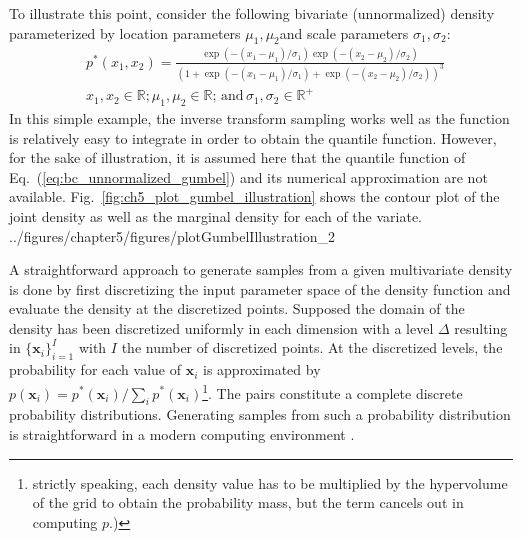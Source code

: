 To illustrate this point,
consider the following bivariate (unnormalized) density parameterized by location parameters $\mu_1, \mu_2$and scale parameters $\sigma_1, \sigma_2$:
\begin{equation}
	\begin{split}
	& p^*(x_1, x_2) = \frac{\exp{(-(x_1 - \mu_1)/\sigma_1)} \exp{(-(x_2 - \mu_2)/\sigma_2)}}{(1 + \exp{(-(x_1 - \mu_1)/\sigma_1)} + \exp{(-(x_2 - \mu_2)/\sigma_2)})^3} \, \\ 
	& x_1, x_2 \in \mathbb{R}; \mu_1, \mu_2 \in \mathbb{R};\, \text{and} \, \sigma_1, \sigma_2 \in \mathbb{R}^+
	\end{split}
\label{eq:bc_unnormalized_gumbel}
\end{equation}
In this simple example,
the inverse transform sampling works well as the function is relatively easy to integrate in order to obtain the quantile function.
However, for the sake of illustration, it is assumed here that the quantile function of Eq.~(\ref{eq:bc_unnormalized_gumbel}) and its numerical approximation are not available.
Fig.~\ref{fig:ch5_plot_gumbel_illustration} shows the contour plot of the joint density as well as the marginal density for each of the variate.
{../figures/chapter5/figures/plotGumbelIllustration_2}

A straightforward approach to generate samples from a given multivariate density is done by first 
discretizing the input parameter space of the density function and evaluate the density at the discretized points.
Supposed the domain of the density has been discretized uniformly in each dimension with a level $\Delta$ resulting in $\{\bm{x}_i\}_{i=1}^{I}$ with $I$ the number of discretized points.
At the discretized levels, the probability for each value of $\bm{x}_i$ is approximated by $p(\bm{x}_i) = p^*(\bm{x}_i) / \sum_i p^*(\bm{x}_i)$\footnote{strictly speaking, each density value has to be multiplied by the hypervolume of the grid to obtain the probability mass, but the term cancels out in computing $p$.)}.
The pairs constitute a complete discrete probability distributions.
Generating samples from such a probability distribution is straightforward in a modern computing environment \cite{Mackay2005}.

